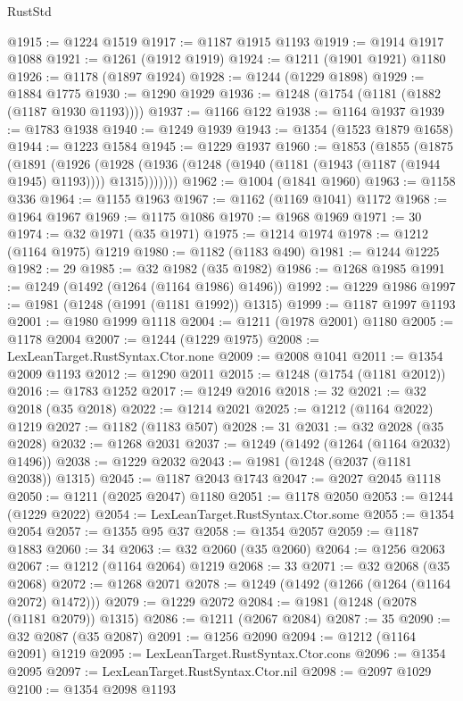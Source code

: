\begin{lexlean}{RustStd}
\begin{coremodule}
@1915 := @1224 @1519
@1917 := @1187 @1915 @1193
@1919 := @1914 @1917 @1088
@1921 := @1261 (@1912 @1919)
@1924 := @1211 (@1901 @1921) @1180
@1926 := @1178 (@1897 @1924)
@1928 := @1244 (@1229 @1898)
@1929 := @1884 @1775
@1930 := @1290 @1929
@1936 := @1248 (@1754 (@1181 (@1882 (@1187 @1930 @1193))))
@1937 := @1166 @122
@1938 := @1164 @1937
@1939 := @1783 @1938
@1940 := @1249 @1939
@1943 := @1354 (@1523 @1879 @1658)
@1944 := @1223 @1584
@1945 := @1229 @1937
@1960 := @1853
    (@1855
      (@1875
        (@1891
          (@1926
            (@1928 (@1936 (@1248 (@1940 (@1181 (@1943 (@1187 (@1944 @1945) @1193)))) @1315)))))))
@1962 := @1004 (@1841 @1960)
@1963 := @1158 @336
@1964 := @1155 @1963
@1967 := @1162 (@1169 @1041) @1172
@1968 := @1964 @1967
@1969 := @1175 @1086
@1970 := @1968 @1969
@1971 := 30
@1974 := @32 @1971 (@35 @1971)
@1975 := @1214 @1974
@1978 := @1212 (@1164 @1975) @1219
@1980 := @1182 (@1183 @490)
@1981 := @1244 @1225
@1982 := 29
@1985 := @32 @1982 (@35 @1982)
@1986 := @1268 @1985
@1991 := @1249 (@1492 (@1264 (@1164 @1986) @1496))
@1992 := @1229 @1986
@1997 := @1981 (@1248 (@1991 (@1181 @1992)) @1315)
@1999 := @1187 @1997 @1193
@2001 := @1980 @1999 @1118
@2004 := @1211 (@1978 @2001) @1180
@2005 := @1178 @2004
@2007 := @1244 (@1229 @1975)
@2008 := LexLeanTarget.RustSyntax.Ctor.none
@2009 := @2008 @1041
@2011 := @1354 @2009 @1193
@2012 := @1290 @2011
@2015 := @1248 (@1754 (@1181 @2012))
@2016 := @1783 @1252
@2017 := @1249 @2016
@2018 := 32
@2021 := @32 @2018 (@35 @2018)
@2022 := @1214 @2021
@2025 := @1212 (@1164 @2022) @1219
@2027 := @1182 (@1183 @507)
@2028 := 31
@2031 := @32 @2028 (@35 @2028)
@2032 := @1268 @2031
@2037 := @1249 (@1492 (@1264 (@1164 @2032) @1496))
@2038 := @1229 @2032
@2043 := @1981 (@1248 (@2037 (@1181 @2038)) @1315)
@2045 := @1187 @2043 @1743
@2047 := @2027 @2045 @1118
@2050 := @1211 (@2025 @2047) @1180
@2051 := @1178 @2050
@2053 := @1244 (@1229 @2022)
@2054 := LexLeanTarget.RustSyntax.Ctor.some
@2055 := @1354 @2054
@2057 := @1355 @95 @37
@2058 := @1354 @2057
@2059 := @1187 @1883
@2060 := 34
@2063 := @32 @2060 (@35 @2060)
@2064 := @1256 @2063
@2067 := @1212 (@1164 @2064) @1219
@2068 := 33
@2071 := @32 @2068 (@35 @2068)
@2072 := @1268 @2071
@2078 := @1249 (@1492 (@1266 (@1264 (@1164 @2072) @1472)))
@2079 := @1229 @2072
@2084 := @1981 (@1248 (@2078 (@1181 @2079)) @1315)
@2086 := @1211 (@2067 @2084)
@2087 := 35
@2090 := @32 @2087 (@35 @2087)
@2091 := @1256 @2090
@2094 := @1212 (@1164 @2091) @1219
@2095 := LexLeanTarget.RustSyntax.Ctor.cons
@2096 := @1354 @2095
@2097 := LexLeanTarget.RustSyntax.Ctor.nil
@2098 := @2097 @1029
@2100 := @1354 @2098 @1193

\end{coremodule}
\end{lexlean}
